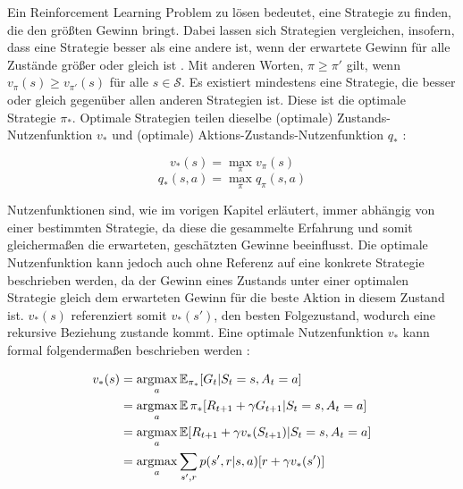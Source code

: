 Ein Reinforcement Learning Problem zu lösen bedeutet, eine Strategie zu finden, die den größten Gewinn bringt. Dabei lassen sich Strategien vergleichen, insofern, dass eine Strategie besser als eine andere ist, wenn der erwartete Gewinn für alle Zustände größer oder gleich ist \cite[S.~62f]{Sutton1998}. Mit anderen Worten, $\pi \geq \pi'$ gilt, wenn $v_\pi(s) \geq v_{\pi'}(s)$ für alle $s \in \mathcal{S}$. Es existiert mindestens eine Strategie, die besser oder gleich gegenüber allen anderen Strategien ist. Diese ist die optimale Strategie $\pi_*$. \newpage
Optimale Strategien teilen dieselbe (optimale) Zustands-Nutzenfunktion $v_*$ und (optimale) Aktions-Zustands-Nutzenfunktion $q_*$ \cite[S.~62f]{Sutton1998}:

\begin{equation}\label{eq:optimaleValueFunction}
    v_*(s) = \max_\pi v_\pi(s)
\end{equation}
\begin{equation}\label{eq:optimaleActionValueFunction}
    q_*(s,a) = \max_\pi q_\pi(s,a)
\end{equation}

Nutzenfunktionen sind, wie im vorigen Kapitel erläutert, immer abhängig von einer bestimmten Strategie, da diese die gesammelte Erfahrung und somit gleichermaßen die erwarteten, geschätzten Gewinne beeinflusst. Die optimale Nutzenfunktion kann jedoch auch ohne Referenz auf eine konkrete Strategie beschrieben werden, da der Gewinn eines Zustands unter einer optimalen Strategie gleich dem erwarteten Gewinn für die beste Aktion in diesem Zustand ist. $v_*(s)$ referenziert somit $v_*(s')$, den besten Folgezustand, wodurch eine rekursive Beziehung zustande kommt. Eine optimale Nutzenfunktion $v_*$ kann formal folgendermaßen beschrieben werden \cite[S.~63]{Sutton1998}:

\begin{equation}\label{eq:bellmanValue}
    \begin{aligned}
        v_*(s) &= \operatorname*{argmax}_a \operatorname{\mathbb{E}}_{\pi_*}[G_t | S_t = s, A_t = a] \\
        &= \operatorname*{argmax}_a \operatorname{\mathbb{E}}{\pi_*}[ R_{t+1} + \gamma G_{t+1} | S_t = s, A_t = a] \\
        &= \operatorname*{argmax}_a \operatorname{\mathbb{E}}[ R_{t+1} + \gamma v_*(S_{t+1}) | S_t = s, A_t = a] \\
        &= \operatorname*{argmax}_a \sum_{s',r}p(s', r | s,a)[r+ \gamma v_*(s')]
    \end{aligned}
\end{equation}

